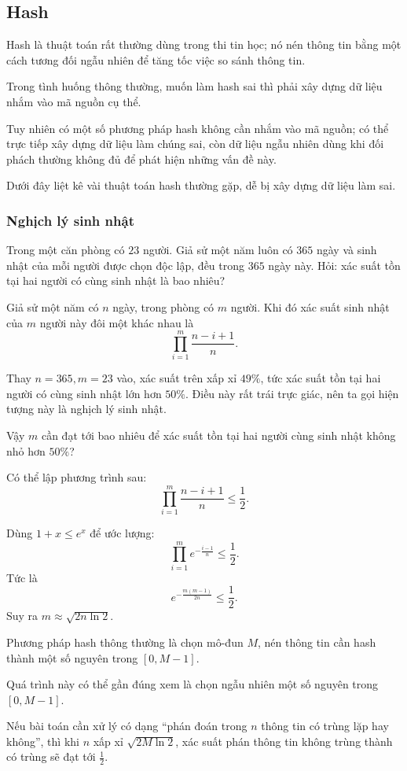 \documentclass[11pt]{article}
\begin{document}
\subsection{Hash}

Hash là thuật toán rất thường dùng trong thi tin học; nó nén thông tin bằng một
cách tương đối ngẫu nhiên để tăng tốc việc so sánh thông tin.

Trong tình huống thông thường, muốn làm hash sai thì phải xây dựng dữ liệu nhắm
vào mã nguồn cụ thể.

Tuy nhiên có một số phương pháp hash không cần nhắm vào mã nguồn; có thể trực
tiếp xây dựng dữ liệu làm chúng sai, còn dữ liệu ngẫu nhiên dùng khi đối phách
thường không đủ để phát hiện những vấn đề này.

Dưới đây liệt kê vài thuật toán hash thường gặp, dễ bị xây dựng dữ liệu làm sai.

\subsubsection{Nghịch lý sinh nhật}

Trong một căn phòng có $23$ người. Giả sử một năm luôn có $365$ ngày và sinh
nhật của mỗi người được chọn độc lập, đều trong $365$ ngày này. Hỏi: xác suất
tồn tại hai người có cùng sinh nhật là bao nhiêu?

Giả sử một năm có $n$ ngày, trong phòng có $m$ người. Khi đó xác suất sinh nhật
của $m$ người này đôi một khác nhau là
\[
\prod_{i=1}^m \frac{n-i+1}{n}.
\]

Thay $n=365,m=23$ vào, xác suất trên xấp xỉ $49\%$, tức xác suất tồn tại hai
người có cùng sinh nhật lớn hơn $50\%$. Điều này rất trái trực giác, nên ta gọi
hiện tượng này là nghịch lý sinh nhật.

Vậy $m$ cần đạt tới bao nhiêu để xác suất tồn tại hai người cùng sinh nhật không
nhỏ hơn $50\%$?

Có thể lập phương trình sau:
\[
\prod_{i=1}^m \frac{n-i+1}{n}\le \frac12.
\]

Dùng $1+x\le e^x$ để ước lượng:
\[
\prod_{i=1}^m e^{-\frac{i-1}{n}}\le \frac12.
\]
Tức là
\[
e^{-\frac{m(m-1)}{2n}}\le \frac12.
\]
Suy ra $m\approx \sqrt{2n\ln 2}$.

Phương pháp hash thông thường là chọn mô-đun $M$, nén thông tin cần hash thành
một số nguyên trong $[0,M-1]$.

Quá trình này có thể gần đúng xem là chọn ngẫu nhiên một số nguyên trong
$[0,M-1]$.

Nếu bài toán cần xử lý có dạng ``phán đoán trong $n$ thông tin có trùng lặp hay
không'', thì khi $n$ xấp xỉ $\sqrt{2M\ln 2}$, xác suất phán thông tin không
trùng thành có trùng sẽ đạt tới $\frac12$.
\end{document}
